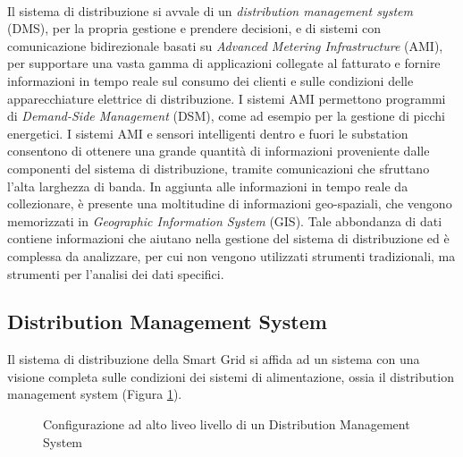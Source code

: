 \\ 
Il sistema di distribuzione si avvale di un \emph{distribution management system} (DMS), per la propria gestione e prendere decisioni, e di sistemi con comunicazione bidirezionale basati su \emph{Advanced Metering Infrastructure} (AMI), per supportare una vasta gamma di applicazioni collegate al fatturato e fornire informazioni in tempo reale sul consumo dei clienti e sulle condizioni delle apparecchiature elettrice di distribuzione. I sistemi AMI permettono programmi di \emph{Demand-Side Management} (DSM), come ad esempio per la gestione di picchi energetici. I sistemi AMI e sensori intelligenti dentro e fuori le substation consentono di ottenere una grande quantità di informazioni proveniente dalle componenti del sistema di distribuzione, tramite comunicazioni che sfruttano l'alta larghezza di banda. In aggiunta alle informazioni in tempo reale da collezionare, è presente una moltitudine di informazioni geo-spaziali, che vengono memorizzati in \emph{Geographic Information System} (GIS). Tale abbondanza di dati contiene informazioni che aiutano nella gestione del sistema di distribuzione ed è complessa da analizzare, per cui non vengono utilizzati strumenti tradizionali, ma strumenti per l'analisi dei dati specifici.    
 
\subsection{Distribution Management System}
Il sistema di distribuzione della Smart Grid si affida ad un sistema con una visione completa sulle condizioni dei sistemi di alimentazione, ossia il distribution management system (Figura \ref{fig:2_10}). 

\begin{figure}[h] 
\caption{Configurazione ad alto liveo livello di un Distribution Management System}\label{fig:2_10}
\end{figure}

